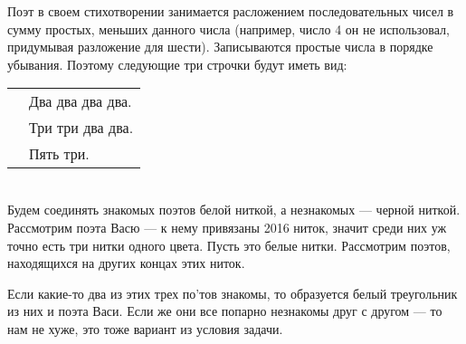 ﻿
\begin{itemize}

\itA
Поэт в своем стихотворении занимается расложением последовательных чисел в сумму простых, меньших данного числа (например, число 4 он не использовал, придумывая разложение для шести). Записываются простые числа в порядке убывания. Поэтому следующие три строчки будут иметь вид: \\
\begin{tabular}{ll}
\qquad & Два два два два. \\
& Три три два два. \\
& Пять три.
\end{tabular}


\itB $\phantom{x}$
\vspace{-0.5cm}
\begin{center}\end{center}
\vspace{0.2cm}

\itC Будем соединять знакомых поэтов белой ниткой, а незнакомых — черной ниткой. Рассмотрим поэта Васю — к нему привязаны 2016 ниток, значит среди них уж точно есть три нитки одного цвета. Пусть это белые нитки. Рассмотрим поэтов, находящихся на других концах этих ниток.

Если какие-то два из этих трех по'тов знакомы, то образуется белый треугольник из них и поэта Васи. Если же они все попарно незнакомы друг с другом — то нам не хуже, это тоже вариант из условия задачи.
\end{itemize}